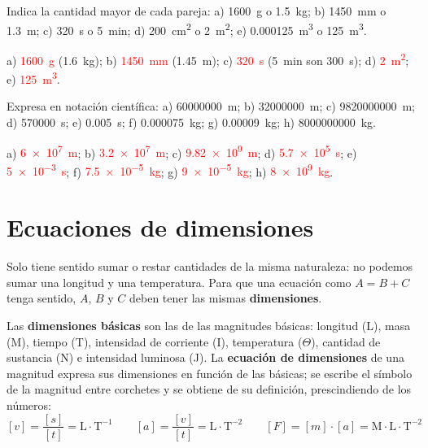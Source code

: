 \begin{exercise}
    Indica la cantidad mayor de cada pareja: a) \qty{1600}{\gram} o \qty{1.5}{\kg}; b) \qty{1450}{\mm} o \qty{1.3}{\m}; c) \qty{320}{\s} o \qty{5}{\minute}; d) \qty{200}{\square\cm} o \qty{2}{\square\m}; e) \qty{0.000125}{\cubic\m} o \qty{125}{\cubic\m}.
    \begin{solu}
        a) \textcolor{red}{\qty{1600}{\gram}} (\qty{1.6}{\kg}); b) \textcolor{red}{\qty{1450}{\mm}} (\qty{1.45}{\m}); c) \textcolor{red}{\qty{320}{\s}} (\qty{5}{\minute} son \qty{300}{\s}); d) \textcolor{red}{\qty{2}{\square\m}}; e) \textcolor{red}{\qty{125}{\cubic\m}}.
    \end{solu}
\end{exercise}

\begin{exercise}
    Expresa en notación científica: a) \qty{60000000}{\m}; b) \qty{32000000}{\m}; c) \qty{9820000000}{\m}; d) \qty{570000}{\s}; e) \qty{0.005}{\s}; f) \qty{0.000075}{\kg}; g) \qty{0.00009}{\kg}; h) \qty{8000000000}{\kg}.
    \begin{solu}
        a) \textcolor{red}{\qty{6e7}{\m}}; b) \textcolor{red}{\qty{3.2e7}{\m}}; c) \textcolor{red}{\qty{9.82e9}{\m}}; d) \textcolor{red}{\qty{5.7e5}{\s}}; e) \textcolor{red}{\qty{5e-3}{\s}}; f) \textcolor{red}{\qty{7.5e-5}{\kg}}; g) \textcolor{red}{\qty{9e-5}{\kg}}; h) \textcolor{red}{\qty{8e9}{\kg}}.
    \end{solu}
\end{exercise}

\section{Ecuaciones de dimensiones}

Solo tiene sentido sumar o restar cantidades de la misma naturaleza: no podemos sumar una longitud y una temperatura. Para que una ecuación como \(A = B + C\) tenga sentido, \(A\), \(B\) y \(C\) deben tener las mismas \textbf{dimensiones}.

Las \textbf{dimensiones básicas} son las de las magnitudes básicas: longitud (L), masa (M), tiempo (T), intensidad de corriente (I), temperatura (\(\Theta\)), cantidad de sustancia (N) e intensidad luminosa (J). La \textbf{ecuación de dimensiones} de una magnitud expresa sus dimensiones en función de las básicas; se escribe el símbolo de la magnitud entre corchetes y se obtiene de su definición, prescindiendo de los números:
\[ [v] = \frac{[s]}{[t]} = \mathrm{L \cdot T^{-1}} \qquad [a] = \frac{[v]}{[t]} = \mathrm{L \cdot T^{-2}} \qquad [F] = [m] \cdot [a] = \mathrm{M \cdot L \cdot T^{-2}} \]

